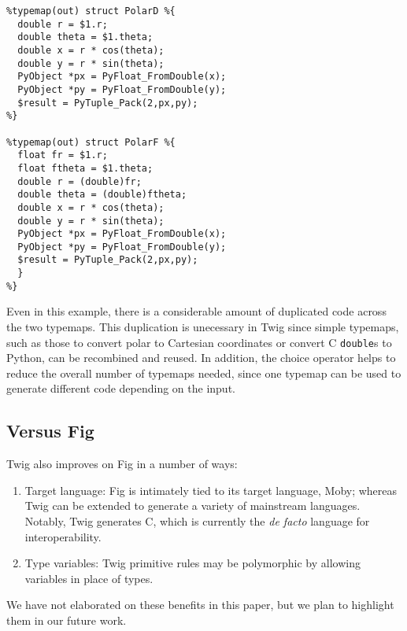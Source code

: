 \begin{verbatim}
%typemap(out) struct PolarD %{
  double r = $1.r;
  double theta = $1.theta;
  double x = r * cos(theta);
  double y = r * sin(theta);
  PyObject *px = PyFloat_FromDouble(x);
  PyObject *py = PyFloat_FromDouble(y);
  $result = PyTuple_Pack(2,px,py);
%}

%typemap(out) struct PolarF %{
  float fr = $1.r;
  float ftheta = $1.theta;
  double r = (double)fr;
  double theta = (double)ftheta;
  double x = r * cos(theta);
  double y = r * sin(theta);
  PyObject *px = PyFloat_FromDouble(x);
  PyObject *py = PyFloat_FromDouble(y);
  $result = PyTuple_Pack(2,px,py);
  }
%}
\end{verbatim}

Even in this example, there is a considerable amount of duplicated code across the two typemaps. This duplication is unecessary in Twig since simple typemaps, such as those to convert polar to Cartesian coordinates or convert C \texttt{double}s to Python, can be recombined and reused. In addition, the choice operator helps to reduce the overall number of typemaps needed, since one typemap can be used to generate different code depending on the input.

\subsection{Versus Fig}

Twig also improves on Fig in a number of ways:

\begin{enumerate}

\item Target language: Fig is intimately tied to its target language, Moby; whereas Twig can be extended to generate a variety of mainstream languages. Notably, Twig generates C, which is currently the \emph{de facto} language for interoperability.

\item Type variables: Twig primitive rules may be polymorphic by allowing variables in place of types.

\end{enumerate}

We have not elaborated on these benefits in this paper, but we plan to highlight them in our future work.
